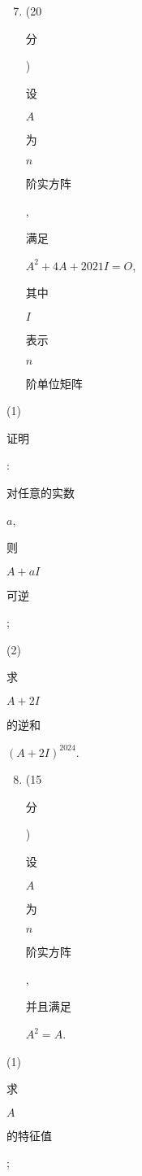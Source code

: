 \documentclass[10pt]{article}
\begin{document}
\begin{enumerate}
  \setcounter{enumi}{6}
  \item (20 \begin{CJK}{UTF8}{mj}分\end{CJK}) \begin{CJK}{UTF8}{mj}设\end{CJK} $A$ \begin{CJK}{UTF8}{mj}为\end{CJK} $n$ \begin{CJK}{UTF8}{mj}阶实方阵\end{CJK}, \begin{CJK}{UTF8}{mj}满足\end{CJK} $A^{2}+4 A+2021 I=O$, \begin{CJK}{UTF8}{mj}其中\end{CJK} $I$ \begin{CJK}{UTF8}{mj}表示\end{CJK} $n$ \begin{CJK}{UTF8}{mj}阶单位矩阵\end{CJK}
\end{enumerate}
(1) \begin{CJK}{UTF8}{mj}证明\end{CJK}: \begin{CJK}{UTF8}{mj}对任意的实数\end{CJK} $a$, \begin{CJK}{UTF8}{mj}则\end{CJK} $A+a I$ \begin{CJK}{UTF8}{mj}可逆\end{CJK};

(2) \begin{CJK}{UTF8}{mj}求\end{CJK} $A+2 I$ \begin{CJK}{UTF8}{mj}的逆和\end{CJK} $(A+2 I)^{2024}$.

\begin{enumerate}
  \setcounter{enumi}{7}
  \item (15 \begin{CJK}{UTF8}{mj}分\end{CJK}) \begin{CJK}{UTF8}{mj}设\end{CJK} $A$ \begin{CJK}{UTF8}{mj}为\end{CJK} $n$ \begin{CJK}{UTF8}{mj}阶实方阵\end{CJK}, \begin{CJK}{UTF8}{mj}并且满足\end{CJK} $A^{2}=A$.
\end{enumerate}
(1) \begin{CJK}{UTF8}{mj}求\end{CJK} $A$ \begin{CJK}{UTF8}{mj}的特征值\end{CJK};
\end{document}
